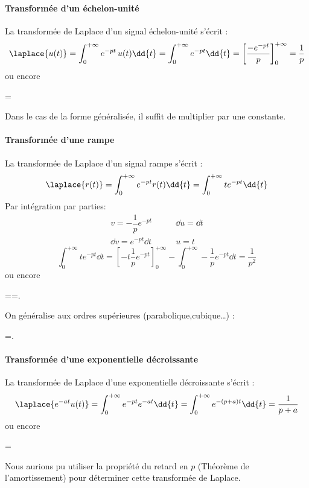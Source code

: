 \paragraph{Transformée d'un échelon-unité}
La transformée de Laplace d'un signal échelon-unité  s'écrit : 
$$
\laplace{u(t)}=\int_{0}^{+\infty}e^{-pt}\,u(t)\dd{t}
=\int_{0}^{+\infty} e^{-pt}\dd{t}
=\left[\dfrac{-e^{-pt}}{p}\right]_0^{+\infty}=\dfrac{1}{p}
$$
ou encore
\begin{bequation}
    =
\end{bequation}
Dans le cas de la forme généralisée, il suffit de multiplier par une constante.

\paragraph{Transformée d'une rampe}
La transformée de Laplace d'un signal rampe s'écrit :
$$
\laplace{r(t)}=\int_{0}^{+\infty} e^{-pt}r(t)\dd{t}
=\int_{0}^{+\infty} te^{-pt}\dd{t}
$$
Par intégration par parties:
\begin{align*}
    v=-\dfrac{1}{p}e^{-pt}\qquad&\dd{u}=\dd{t}\\
    \dd{v}=e^{-pt}\dd{t}\qquad&u=t
\end{align*}
$$
\int_{0}^{+\infty} te^{-pt}\dd{t}
=\left[-t\dfrac{1}{p}e^{-pt}\right]_0^{+\infty}-\int_{0}^{+\infty}
-\dfrac{1}{p}e^{-pt}\dd{t}=\dfrac{1}{p^2}
$$
ou encore
\begin{bequation}
    ==.
\end{bequation}

On généralise aux ordres supérieures (parabolique,cubique\ldots) :
\begin{bequation}
    =.
\end{bequation}


\paragraph{Transformée d'une exponentielle décroissante}
La transformée de Laplace d'une exponentielle décroissante s'écrit :
$$
\laplace{e^{-at}u(t)}=\int_{0}^{+\infty} e^{-pt}e^{-at}\dd{t}
=\int_{0}^{+\infty} e^{-(p+a)t}\dd{t} = \dfrac{1}{p+a}
$$
ou encore
\begin{bequation}
    =
\end{bequation}
Nous aurions pu utiliser la propriété du retard en $p$ 
(Théorème de l'amortissement) pour déterminer cette transformée de Laplace.



